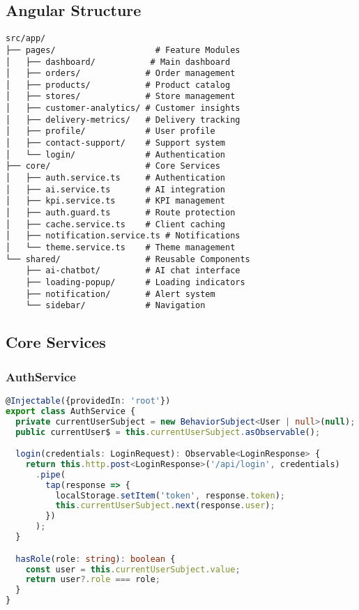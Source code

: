 \documentclass[11pt,a4paper]{article}
\begin{document}
\subsection{Angular Structure}

\begin{lstlisting}[language=text, caption=Frontend Structure]
src/app/
├── pages/                    # Feature Modules
│   ├── dashboard/           # Main dashboard
│   ├── orders/             # Order management
│   ├── products/           # Product catalog
│   ├── stores/             # Store management
│   ├── customer-analytics/ # Customer insights
│   ├── delivery-metrics/   # Delivery tracking
│   ├── profile/            # User profile
│   ├── contact-support/    # Support system
│   └── login/              # Authentication
├── core/                   # Core Services
│   ├── auth.service.ts     # Authentication
│   ├── ai.service.ts       # AI integration
│   ├── kpi.service.ts      # KPI management
│   ├── auth.guard.ts       # Route protection
│   ├── cache.service.ts    # Client caching
│   ├── notification.service.ts # Notifications
│   └── theme.service.ts    # Theme management
└── shared/                 # Reusable Components
    ├── ai-chatbot/         # AI chat interface
    ├── loading-popup/      # Loading indicators
    ├── notification/       # Alert system
    └── sidebar/            # Navigation
\end{lstlisting}

\subsection{Core Services}

\subsubsection{AuthService}

\begin{lstlisting}[language=typescript, caption=Authentication Service]
@Injectable({providedIn: 'root'})
export class AuthService {
  private currentUserSubject = new BehaviorSubject<User | null>(null);
  public currentUser$ = this.currentUserSubject.asObservable();

  login(credentials: LoginRequest): Observable<LoginResponse> {
    return this.http.post<LoginResponse>('/api/login', credentials)
      .pipe(
        tap(response => {
          localStorage.setItem('token', response.token);
          this.currentUserSubject.next(response.user);
        })
      );
  }

  hasRole(role: string): boolean {
    const user = this.currentUserSubject.value;
    return user?.role === role;
  }
}
\end{lstlisting}
\end{document}
